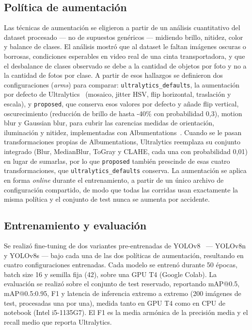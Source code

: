 \documentclass[conference]{IEEEtran}
\begin{document}
\subsection{Pol\'itica de aumentaci\'on}

Las t\'ecnicas de aumentaci\'on se eligieron a partir de un an\'alisis cuantitativo del dataset
procesado --- no de supuestos gen\'ericos --- midiendo brillo, nitidez, color y balance de
clases. El an\'alisis mostr\'o que al dataset le faltan im\'agenes oscuras o borrosas,
condiciones esperables en video real de una cinta transportadora, y que el desbalance de
clases observado se debe a la cantidad de objetos por foto y no a la cantidad de fotos por
clase. A partir de esos hallazgos se definieron dos configuraciones (\emph{arms}) para
comparar: \texttt{ultralytics\_defaults}, la aumentaci\'on por defecto de
Ultralytics~\cite{ultralytics2023} (mosaico, jitter HSV, flip horizontal, traslaci\'on y
escala), y \texttt{proposed}, que conserva esos valores por defecto y a\~nade flip vertical,
oscurecimiento (reducci\'on de brillo de hasta -40\% con probabilidad 0,3), motion blur y
Gaussian blur, para cubrir las carencias medidas de orientaci\'on, iluminaci\'on y nitidez,
implementadas con Albumentations~\cite{buslaev2020}. Cuando se le pasan transformaciones propias
de Albumentations, Ultralytics reemplaza su conjunto integrado (Blur, MedianBlur, ToGray y
CLAHE, cada una con probabilidad 0,01) en lugar de sumarlas, por lo que \texttt{proposed}
tambi\'en prescinde de esas cuatro transformaciones, que \texttt{ultralytics\_defaults}
conserva. La aumentaci\'on se aplica en forma \emph{online} durante el
entrenamiento, a partir de un \'unico archivo de configuraci\'on compartido, de modo que todas
las corridas usan exactamente la misma pol\'itica y el conjunto de test nunca se aumenta por
accidente.

\subsection{Entrenamiento y evaluaci\'on}

Se realiz\'o fine-tuning de dos variantes pre-entrenadas de YOLOv8~\cite{ultralytics2023} ---
YOLOv8n y YOLOv8s --- bajo cada una de las dos pol\'iticas de aumentaci\'on, resultando en
cuatro configuraciones entrenadas. Cada modelo se entren\'o durante 50 \'epocas, batch size 16
y semilla fija (42), sobre una GPU T4 (Google Colab). La evaluaci\'on se realiz\'o sobre el
conjunto de test reservado, reportando mAP@0.5, mAP@0.5:0.95, F1 y latencia de inferencia
extremo a extremo (200 im\'agenes de test, procesadas una por una), medida tanto en GPU T4 como
en CPU de notebook (Intel i5-1135G7). El F1 es la media arm\'onica de la precisi\'on media y el
recall medio que reporta Ultralytics.
\end{document}
